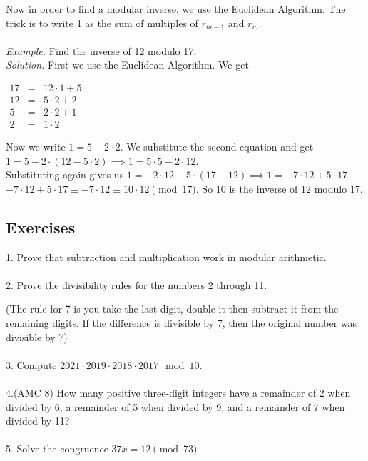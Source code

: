 \documentclass{article}
\begin{document}
Now in order to find a modular inverse, we use the Euclidean Algorithm.
The trick is to write 1 as the sum of multiples of $r_{m-1}$ and $r_m$.\\\\
\emph{Example.} Find the inverse of 12 modulo 17. \\
\emph{Solution.} First we use the Euclidean Algorithm. We get \\
\begin{center}
$\begin{array}{rcl}
    17 &= &12\cdot 1 + 5\\
    12 &= &5 \cdot 2 + 2\\
    5 &= &2 \cdot 2 + 1\\
    2 &= &1 \cdot 2
\end{array}$
\end{center}
Now we write $1 = 5-2\cdot 2$. We substitute the second equation and get
 $1 = 5 - 2\cdot(12-5\cdot 2) \implies 1 = 5\cdot 5 -2 \cdot 12$. \\
 Substituting again gives us
 $1 = -2\cdot 12 + 5\cdot(17-12) \implies 1 = -7 \cdot 12 + 5 \cdot 17$.\\ 
 $-7 \cdot 12 + 5\cdot 17 \equiv -7\cdot 12 \equiv 10 \cdot 12 \pmod{17}$. So $\boxed{10}$ is the inverse of 12 modulo 17.
\subsection*{Exercises}
1. Prove that subtraction and multiplication work in modular arithmetic.
\\
\\
2. Prove the divisibility rules for the numbers 2 through 11. 

(The rule for 7 is you take the last digit, double it then subtract it from the remaining digits. If the difference is divisible by 7, then the original number was divisible by 7)
\\
\\
3. Compute $2021 \cdot 2019 \cdot 2018 \cdot 2017 \mod{10}$.\\\\
4.(AMC 8) How many positive three-digit integers have a remainder of 2 when divided by 6, a remainder of 5 when divided by 9, and a remainder of 7 when divided by 11?\\\\
5. Solve the congruence $37x = 12 \pmod{73}$
\end{document}
